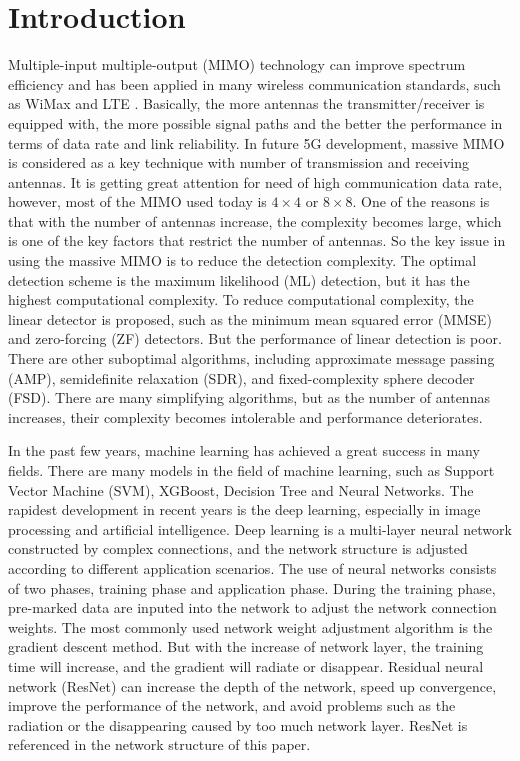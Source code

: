 \documentclass[conference]{IEEEtran}
\begin{document}
\section{Introduction}
Multiple-input multiple-output (MIMO) technology can improve spectrum efficiency and has been applied in many wireless communication standards, such as WiMax and LTE \cite{LTE}\cite{MIMO1}. Basically, the more antennas the transmitter/receiver is equipped with, the more possible signal paths and the better the performance in terms of data rate and link reliability. In future 5G development, massive MIMO is considered as a key technique with number of transmission and receiving antennas. It is getting great attention for need of high communication data rate, however, most of the MIMO used today is ${4 \times 4}$ or ${8 \times 8}$. One of the reasons is that with the number of antennas increase, the complexity becomes large, which is one of the key factors that restrict the number of antennas. So the key issue in using the massive MIMO is to reduce the detection complexity. The optimal detection scheme is the maximum likelihood (ML) detection, but it has the highest computational complexity. To reduce computational complexity, the linear detector is proposed, such as the minimum mean squared error (MMSE) and zero-forcing (ZF)\cite{MIMO2} detectors. But the performance of linear detection is poor. There are other suboptimal algorithms, including approximate message passing (AMP)\cite{AMP}, semidefinite relaxation (SDR)\cite{SDR}, \cite{detector} and fixed-complexity sphere decoder (FSD)\cite{FSD}. There are many simplifying algorithms, but as the number of antennas increases, their complexity becomes intolerable and performance deteriorates.

In the past few years, machine learning has achieved a great success in many fields. There are many models in the field of machine learning, such as Support Vector Machine (SVM), XGBoost\cite{XGBoost}, Decision Tree and Neural Networks. The rapidest development in recent years is the deep learning, especially in image processing and artificial intelligence. Deep learning is a multi-layer neural network constructed by complex connections, and the network structure is adjusted according to different application scenarios. The use of neural networks consists of two phases, training phase and application phase. During the training phase, pre-marked data are inputed into the network to adjust the network connection weights. The most commonly used network weight adjustment algorithm is the gradient descent method. But with the increase of network layer, the training time will increase, and the gradient will radiate or disappear\cite{normalization}. Residual neural network (ResNet)\cite{ResNet} can increase the depth of the network, speed up convergence, improve the performance of the network, and avoid problems such as the radiation or the disappearing caused by too much network layer. ResNet is referenced in the network structure of this paper.
\end{document}
